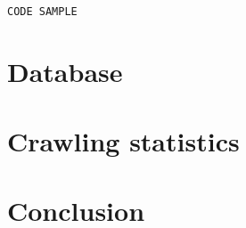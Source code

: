 \documentclass[runningheads]{llncs}
\begin{document}
\begin{lstlisting}

CODE SAMPLE

\end{lstlisting}



\section{Database}

\section{Crawling statistics}

\section{Conclusion}

 
 
 
\end{document}
